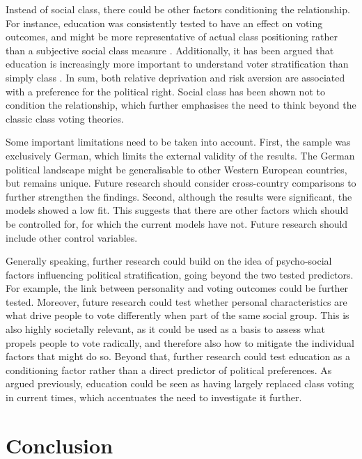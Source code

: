 \documentclass[stu,12pt]{apa7}
\begin{document}
Instead of social class, there could be other factors conditioning the relationship. For instance, education was consistently tested to have an effect on voting outcomes, and might be more representative of actual class positioning rather than a subjective social class measure \parencite{gethinBrahminLeftMerchant2022, simonExplainingEducationalDivide2022}. Additionally, it has been argued that education is increasingly more important to understand voter stratification than simply class \parencite{gethinBrahminLeftMerchant2022, hoogheHowDoesEducation2026}. In sum, both relative deprivation and risk aversion are associated with a preference for the political right. Social class has been shown not to condition the relationship, which further emphasises the need to think beyond the classic class voting theories.

Some important limitations need to be taken into account. First, the sample was exclusively German, which limits the external validity of the results. The German political landscape might be generalisable to other Western European countries, but remains unique. Future research should consider cross-country comparisons to further strengthen the findings. Second, although the results were significant, the models showed a low fit. This suggests that there are other factors which should be controlled for, for which the current models have not. Future research should include other control variables.

Generally speaking, further research could build on the idea of psycho-social factors influencing political stratification, going beyond the two tested predictors. For example, the link between personality and voting outcomes could be further tested. Moreover, future research could test whether personal characteristics are what drive people to vote differently when part of the same social group. This is also highly societally relevant, as it could be used as a basis to assess what propels people to vote radically, and therefore also how to mitigate the individual factors that might do so. Beyond that, further research could test education as a conditioning factor rather than a direct predictor of political preferences. As argued previously, education could be seen as having largely replaced class voting in current times, which accentuates the need to investigate it further.

\section{Conclusion}
\end{document}
